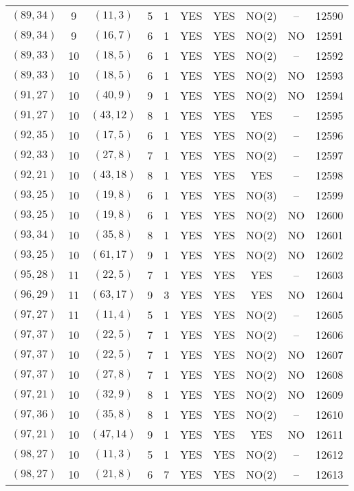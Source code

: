 \begin{longtable}{|c|c|c|c|c|c|c|c|c|c|}
$(89, 34)$ & 9 & $(11, 3)$ & 5 & 1 & YES & YES & NO(2) & -- & 12590\\
$(89, 34)$ & 9 & $(16, 7)$ & 6 & 1 & YES & YES & NO(2) & NO & 12591\\
$(89, 33)$ & 10 & $(18, 5)$ & 6 & 1 & YES & YES & NO(2) & -- & 12592\\
$(89, 33)$ & 10 & $(18, 5)$ & 6 & 1 & YES & YES & NO(2) & NO & 12593\\
$(91, 27)$ & 10 & $(40, 9)$ & 9 & 1 & YES & YES & NO(2) & NO & 12594\\
$(91, 27)$ & 10 & $(43, 12)$ & 8 & 1 & YES & YES & YES & -- & 12595\\
$(92, 35)$ & 10 & $(17, 5)$ & 6 & 1 & YES & YES & NO(2) & -- & 12596\\
$(92, 33)$ & 10 & $(27, 8)$ & 7 & 1 & YES & YES & NO(2) & -- & 12597\\
$(92, 21)$ & 10 & $(43, 18)$ & 8 & 1 & YES & YES & YES & -- & 12598\\
$(93, 25)$ & 10 & $(19, 8)$ & 6 & 1 & YES & YES & NO(3) & -- & 12599\\
$(93, 25)$ & 10 & $(19, 8)$ & 6 & 1 & YES & YES & NO(2) & NO & 12600\\
$(93, 34)$ & 10 & $(35, 8)$ & 8 & 1 & YES & YES & NO(2) & NO & 12601\\
$(93, 25)$ & 10 & $(61, 17)$ & 9 & 1 & YES & YES & NO(2) & NO & 12602\\
$(95, 28)$ & 11 & $(22, 5)$ & 7 & 1 & YES & YES & YES & -- & 12603\\
$(96, 29)$ & 11 & $(63, 17)$ & 9 & 3 & YES & YES & YES & NO & 12604\\
$(97, 27)$ & 11 & $(11, 4)$ & 5 & 1 & YES & YES & NO(2) & -- & 12605\\
$(97, 37)$ & 10 & $(22, 5)$ & 7 & 1 & YES & YES & NO(2) & -- & 12606\\
$(97, 37)$ & 10 & $(22, 5)$ & 7 & 1 & YES & YES & NO(2) & NO & 12607\\
$(97, 37)$ & 10 & $(27, 8)$ & 7 & 1 & YES & YES & NO(2) & NO & 12608\\
$(97, 21)$ & 10 & $(32, 9)$ & 8 & 1 & YES & YES & NO(2) & NO & 12609\\
$(97, 36)$ & 10 & $(35, 8)$ & 8 & 1 & YES & YES & NO(2) & -- & 12610\\
$(97, 21)$ & 10 & $(47, 14)$ & 9 & 1 & YES & YES & YES & NO & 12611\\
$(98, 27)$ & 10 & $(11, 3)$ & 5 & 1 & YES & YES & NO(2) & -- & 12612\\
$(98, 27)$ & 10 & $(21, 8)$ & 6 & 7 & YES & YES & NO(2) & -- & 12613\\

\end{longtable}
